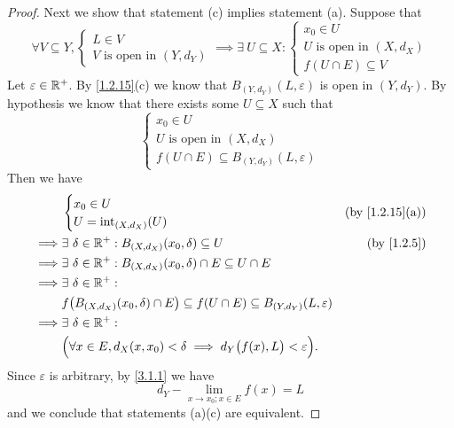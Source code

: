 \begin{proof}
  Next we show that statement (c) implies statement (a).
  Suppose that
  \[
    \forall V \subseteq Y, \begin{cases}
      L \in V \\
      V \text{ is open in } (Y, d_Y)
    \end{cases} \implies \exists\ U \subseteq X : \begin{cases}
      x_0 \in U                      \\
      U \text{ is open in } (X, d_X) \\
      f(U \cap E) \subseteq V
    \end{cases}
  \]
  Let \(\varepsilon \in \mathbb{R}^+\).
  By \cref{1.2.15}(c) we know that \(B_{(Y, d_Y)}(L, \varepsilon)\) is open in \((Y, d_Y)\).
  By hypothesis we know that there exists some \(U \subseteq X\) such that
  \[
    \begin{cases}
      x_0 \in U                      \\
      U \text{ is open in } (X, d_X) \\
      f(U \cap E) \subseteq B_{(Y, d_Y)}(L, \varepsilon)
    \end{cases}
  \]
  Then we have
  \begin{align*}
             & \begin{cases}
                 x_0 \in U \\
                 U = \text{int}_{(X, d_X)}(U)
               \end{cases}                                                                             & \text{(by \cref{1.2.15}(a))}              \\
    \implies & \exists\ \delta \in \R^+ : B_{(X, d_X)}(x_0, \delta) \subseteq U                                         & \text{(by \cref{1.2.5})} \\
    \implies & \exists\ \delta \in \R^+ : B_{(X, d_X)}(x_0, \delta) \cap E \subseteq U \cap E                                                      \\
    \implies & \exists\ \delta \in \R^+ :                                                                                                          \\
             & f\big(B_{(X, d_X)}(x_0, \delta) \cap E\big) \subseteq f(U \cap E) \subseteq B_{(Y, d_Y)}(L, \varepsilon)                            \\
    \implies & \exists\ \delta \in \R^+ :                                                                                                          \\
             & \Big(\forall x \in E, d_X(x, x_0) < \delta \implies d_Y\big(f(x), L\big) < \varepsilon\Big).
  \end{align*}
  Since \(\varepsilon\) is arbitrary, by \cref{3.1.1} we have
  \[
    d_Y - \lim_{x \to x_0 ; x \in E} f(x) = L
  \]
  and we conclude that statements (a)(c) are equivalent.


\end{proof}

